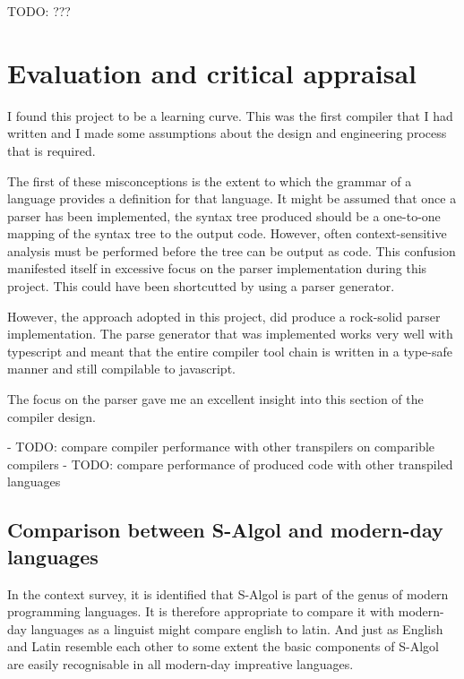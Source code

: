 \documentclass{article}
\begin{document}
TODO: ???
 
\section{Evaluation and critical appraisal}

I found this project to be a learning curve. This was the first compiler that I had written and I made some assumptions about the design and engineering process that is required.

The first of these misconceptions is the extent to which the grammar of a language provides a definition for that language. It might be assumed that once a parser has been implemented, the syntax tree produced should be a one-to-one mapping of the syntax tree to the output code. However, often context-sensitive analysis must be performed before the tree can be output as code. This confusion manifested itself in excessive focus on the parser implementation during this project. This could have been shortcutted by using a parser generator.

However, the approach adopted in this project, did produce a rock-solid parser implementation. The parse generator that was implemented works very well with typescript and meant that the entire compiler tool chain is written in a type-safe manner and still compilable to javascript. 

The focus on the parser gave me an excellent insight into this section of the compiler design.


- TODO: compare compiler performance with other transpilers on comparible compilers
- TODO: compare performance of produced code with other transpiled languages

\subsection{Comparison between S-Algol and modern-day languages}

In the context survey, it is identified that S-Algol is part of the genus of modern programming languages. It is therefore appropriate to compare it with modern-day languages as a linguist might compare english to latin. And just as English and Latin resemble each other to some extent the basic components of S-Algol are easily recognisable in all modern-day impreative languages.
\end{document}
